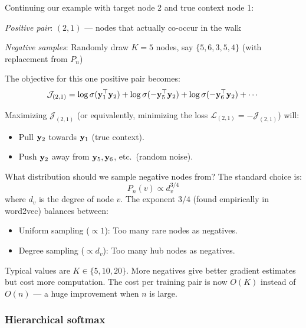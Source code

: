 \begin{notechapter}
\begin{example}
Continuing our example with target node 2 and true context node 1:

\emph{Positive pair}: $(2, 1)$ --- nodes that actually co-occur in the walk

\emph{Negative samples}: Randomly draw $K=5$ nodes, say $\{5, 6, 3, 5, 4\}$ (with replacement from $P_n$)

The objective for this one positive pair becomes:
\[
\mathcal{J}_{(2,1)} = \log \sigma(\mathbf{y}_1^\top \mathbf{y}_2) + \log \sigma(-\mathbf{y}_5^\top \mathbf{y}_2) + \log \sigma(-\mathbf{y}_6^\top \mathbf{y}_2) + \cdots
\]

Maximizing $\mathcal{J}_{(2,1)}$ (or equivalently, minimizing the loss $\mathcal{L}_{(2,1)} = -\mathcal{J}_{(2,1)}$) will:
\begin{itemize}
    \item Pull $\mathbf{y}_2$ towards $\mathbf{y}_1$ (true context).
    \item Push $\mathbf{y}_2$ away from $\mathbf{y}_5, \mathbf{y}_6$, etc.\ (random noise).
\end{itemize}
\end{example}

\begin{remark}
What distribution should we sample negative nodes from? The standard choice is:
\[
P_n(v) \propto d_v^{3/4}
\]
where $d_v$ is the degree of node $v$. The exponent $3/4$ (found empirically in word2vec) balances between:
\begin{itemize}
    \item Uniform sampling ($\propto 1$): Too many rare nodes as negatives.
    \item Degree sampling ($\propto d_v$): Too many hub nodes as negatives.
\end{itemize}
\end{remark}

\begin{remark}
Typical values are $K \in \{5, 10, 20\}$. More negatives give better gradient estimates but cost more computation. The cost per training pair is now $O(K)$ instead of $O(n)$ --- a huge improvement when $n$ is large.
\end{remark}

\subsubsection*{Hierarchical softmax}


\end{notechapter}
